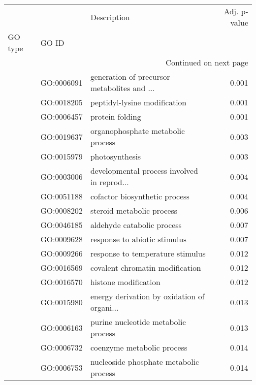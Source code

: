 \begin{longtable}{lllr}
\toprule
   &            &                                  Description &  Adj. p-value \\
GO type & GO ID &                                              &               \\
\midrule
\endhead
\midrule
\multicolumn{4}{r}{{Continued on next page}} \\
\midrule
\endfoot

\bottomrule
\endlastfoot
\multirow{87}{*}{BP} & GO:0006091 &  generation of precursor metabolites and ... &         0.001 \\
   & GO:0018205 &                 peptidyl-lysine modification &         0.001 \\
   & GO:0006457 &                              protein folding &         0.001 \\
   & GO:0019637 &            organophosphate metabolic process &         0.003 \\
   & GO:0015979 &                               photosynthesis &         0.003 \\
   & GO:0003006 &  developmental process involved in reprod... &         0.004 \\
   & GO:0051188 &                cofactor biosynthetic process &         0.004 \\
   & GO:0008202 &                    steroid metabolic process &         0.006 \\
   & GO:0046185 &                   aldehyde catabolic process &         0.007 \\
   & GO:0009628 &                 response to abiotic stimulus &         0.007 \\
   & GO:0009266 &             response to temperature stimulus &         0.012 \\
   & GO:0016569 &              covalent chromatin modification &         0.012 \\
   & GO:0016570 &                         histone modification &         0.012 \\
   & GO:0015980 &  energy derivation by oxidation of organi... &         0.013 \\
   & GO:0006163 &          purine nucleotide metabolic process &         0.013 \\
   & GO:0006732 &                   coenzyme metabolic process &         0.014 \\
   & GO:0006753 &       nucleoside phosphate metabolic process &         0.014 \\

\end{longtable}
